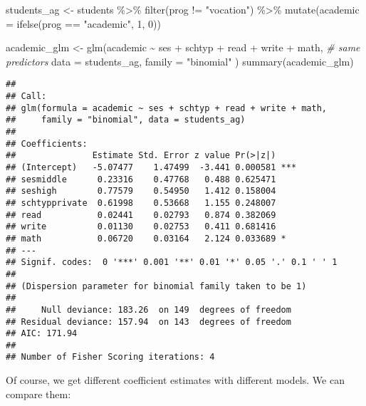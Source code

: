 \documentclass[
  oneside]{book}
\newenvironment{Shaded}{\begin{snugshade}}{\end{snugshade}}
\newcommand{\AttributeTok}[1]{\textcolor[rgb]{0.77,0.63,0.00}{#1}}
\newcommand{\CommentTok}[1]{\textcolor[rgb]{0.56,0.35,0.01}{\textit{#1}}}
\newcommand{\DecValTok}[1]{\textcolor[rgb]{0.00,0.00,0.81}{#1}}
\newcommand{\FunctionTok}[1]{\textcolor[rgb]{0.00,0.00,0.00}{#1}}
\newcommand{\NormalTok}[1]{#1}
\newcommand{\OtherTok}[1]{\textcolor[rgb]{0.56,0.35,0.01}{#1}}
\newcommand{\SpecialCharTok}[1]{\textcolor[rgb]{0.00,0.00,0.00}{#1}}
\newcommand{\StringTok}[1]{\textcolor[rgb]{0.31,0.60,0.02}{#1}}
\begin{document}
\begin{Shaded}
\begin{Highlighting}[]
\NormalTok{students\_ag }\OtherTok{\textless{}{-}}\NormalTok{ students }\SpecialCharTok{\%\textgreater{}\%}
  \FunctionTok{filter}\NormalTok{(prog }\SpecialCharTok{!=} \StringTok{"vocation"}\NormalTok{) }\SpecialCharTok{\%\textgreater{}\%}
  \FunctionTok{mutate}\NormalTok{(}\AttributeTok{academic =} \FunctionTok{ifelse}\NormalTok{(prog }\SpecialCharTok{==} \StringTok{"academic"}\NormalTok{, }\DecValTok{1}\NormalTok{, }\DecValTok{0}\NormalTok{))}

\NormalTok{academic\_glm }\OtherTok{\textless{}{-}} \FunctionTok{glm}\NormalTok{(academic }\SpecialCharTok{\textasciitilde{}}\NormalTok{ ses }\SpecialCharTok{+}\NormalTok{ schtyp }\SpecialCharTok{+}\NormalTok{ read }\SpecialCharTok{+}\NormalTok{ write }\SpecialCharTok{+}\NormalTok{ math, }\CommentTok{\# same predictors}
  \AttributeTok{data =}\NormalTok{ students\_ag, }\AttributeTok{family =} \StringTok{"binomial"}
\NormalTok{)}
\FunctionTok{summary}\NormalTok{(academic\_glm)}
\end{Highlighting}
\end{Shaded}

\begin{verbatim}
## 
## Call:
## glm(formula = academic ~ ses + schtyp + read + write + math, 
##     family = "binomial", data = students_ag)
## 
## Coefficients:
##               Estimate Std. Error z value Pr(>|z|)    
## (Intercept)   -5.07477    1.47499  -3.441 0.000581 ***
## sesmiddle      0.23316    0.47768   0.488 0.625471    
## seshigh        0.77579    0.54950   1.412 0.158004    
## schtypprivate  0.61998    0.53668   1.155 0.248007    
## read           0.02441    0.02793   0.874 0.382069    
## write          0.01130    0.02753   0.411 0.681416    
## math           0.06720    0.03164   2.124 0.033689 *  
## ---
## Signif. codes:  0 '***' 0.001 '**' 0.01 '*' 0.05 '.' 0.1 ' ' 1
## 
## (Dispersion parameter for binomial family taken to be 1)
## 
##     Null deviance: 183.26  on 149  degrees of freedom
## Residual deviance: 157.94  on 143  degrees of freedom
## AIC: 171.94
## 
## Number of Fisher Scoring iterations: 4
\end{verbatim}

Of course, we get different coefficient estimates with different models.
We can compare them:

\begin{Shaded}
\end{Shaded}
\end{document}
